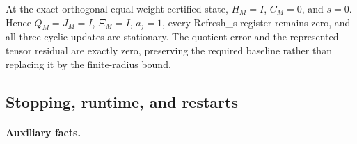 At the exact orthogonal equal-weight certified state,
\(H_M=I\), \(C_M=0\), and \(s=0\). Hence \(Q_M=J_M=I\),
\(\Xi_M=I\), \(a_j=1\), every Refresh\_s register remains zero, and all
three cyclic updates are stationary. The quotient error and the represented
tensor residual are exactly zero, preserving the required baseline rather
than replacing it by the finite-radius bound.

\subsection{Stopping, runtime, and restarts}\label{app:step-012}

\paragraph{Auxiliary facts.}

